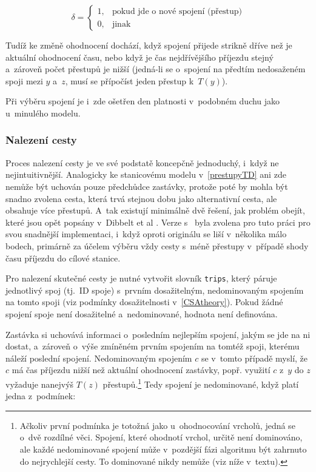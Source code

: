 \[
\delta =
\begin{cases}
1, & \text{pokud jde o~nové spojení (přestup)} \\
0, & \text{jinak}
\end{cases}
\]

Tudíž ke změně ohodnocení dochází, když spojení přijede strikně dříve než je aktuální ohodnocení času, nebo když je čas nejdřívějšího příjezdu stejný a~zároveň počet přestupů je nižší (jedná-li se o~spojení na předtím nedosaženém spoji mezi \(y\) a~\(z\), musí se přípočíst jeden přestup k~\(T(y)\)).

Při výběru spojení je i~zde ošetřen den platnosti v~podobném duchu jako u~minulého modelu.

\subsubsection{Nalezení cesty}
\renewcommand{\subsectionautorefname}{pododdíle}
Proces nalezení cesty je ve své podstatě koncepčně jednoduchý, i~když ne nejintuitivnější. Analogicky ke stanicovému modelu v~\autoref{prestupyTD} ani zde nemůže být uchován pouze předchůdce zastávky, protože poté by mohla být snadno zvolena cesta, která trvá stejnou dobu jako alternativní cesta, ale obsahuje více přestupů. A~tak existují minimálně dvě řešení, jak problém obejít, které jsou opět popsány v~Dibbelt et al \cite{dibbelt2017CSA}. Verze s~ byla zvolena pro tuto práci pro svou snadnější implementaci, i~když oproti originálu se liší v~několika málo bodech, primárně za účelem výběru vždy cesty s~méně přestupy v~případě shody času příjezdu do cílové stanice.

Pro nalezení skutečné cesty je nutné vytvořit slovník \texttt{trips}, který páruje jednotlivý spoj (tj.~ID spoje) s~prvním dosažitelným, nedominovaným spojením na tomto spoji (viz podmínky dosažitelnosti v~\autoref{CSAtheory}). Pokud žádné spojení spoje není dosažitelné a~nedominované, hodnota není definována.

Zastávka si uchovává informaci o~posledním nejlepším spojení, jakým se jde na ni dostat, a~zároveň o~výše zmíněném prvním spojením na tomtéž spoji, kterému náleží poslední spojení. Nedominovaným spojením $c$ se v~tomto případě myslí, že $c$ má čas příjezdu nižší než aktuální ohodnocení zastávky, popř. využití $c$ z~$y$ do $z$ vyžaduje nanejvýš $T(z)$ přestupů.\footnote{Ačkoliv první podmínka je totožná jako u~ohodnocování vrcholů, jedná se o~dvě rozdílné věci. Spojení, které ohodnotí vrchol, určitě není dominováno, ale každé nedominované spojení může v~pozdější fázi algoritmu být zahrnuto do nejrychlejší cesty. To dominované nikdy nemůže (viz níže v~textu).} Tedy spojení je nedominované, když platí jedna z~podmínek:

